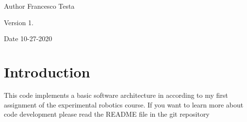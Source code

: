 \begin{DoxyAuthor}{Author}
Francesco Testa 
\end{DoxyAuthor}
\begin{DoxyVersion}{Version}
1. 
\end{DoxyVersion}
\begin{DoxyDate}{Date}
10-\/27-\/2020
\end{DoxyDate}
\hypertarget{index_Introduction}{}\section{Introduction}\label{index_Introduction}
This code implements a basic software architecture in according to my first assignment of the experimental robotics course. If you want to learn more about code development please read the R\+E\+A\+D\+ME file in the git repository 